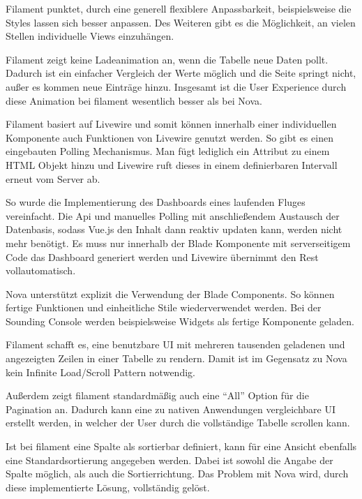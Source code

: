 \newpage

Filament punktet, durch eine generell flexiblere Anpassbarkeit, beispielsweise die Styles lassen sich besser anpassen.
Des Weiteren gibt es die Möglichkeit, an vielen Stellen individuelle Views einzuhängen.

Filament zeigt keine Ladeanimation an, wenn die Tabelle neue Daten pollt.
Dadurch ist ein einfacher Vergleich der Werte möglich und die Seite springt nicht, außer es kommen neue Einträge hinzu.
Insgesamt ist die User Experience durch diese Animation bei filament wesentlich besser als bei Nova.

Filament basiert auf Livewire\cite{livewire} und somit können innerhalb einer individuellen Komponente auch Funktionen von Livewire genutzt werden.
So gibt es einen eingebauten Polling Mechanismus.
Man fügt lediglich ein Attribut zu einem HTML Objekt hinzu und Livewire ruft dieses in einem definierbaren Intervall erneut vom Server ab.

So wurde die Implementierung des Dashboards eines laufenden Fluges vereinfacht.
Die Api und manuelles Polling mit anschließendem Austausch der Datenbasis, sodass Vue.js den Inhalt dann reaktiv updaten kann, werden nicht mehr benötigt.
Es muss nur innerhalb der Blade Komponente mit serverseitigem Code das Dashboard generiert werden und Livewire übernimmt den Rest vollautomatisch.

\newpage

Nova unterstützt explizit die Verwendung der Blade Components.
So können fertige Funktionen und einheitliche Stile wiederverwendet werden.
Bei der Sounding Console werden beispielsweise Widgets als fertige Komponente geladen.

Filament schafft es, eine benutzbare UI mit mehreren tausenden geladenen und angezeigten Zeilen in einer Tabelle zu rendern.
Damit ist im Gegensatz zu Nova kein Infinite Load/Scroll Pattern notwendig.

Außerdem zeigt filament standardmäßig auch eine \enquote{All} Option für die Pagination an.
Dadurch kann eine zu nativen Anwendungen vergleichbare UI erstellt werden, in welcher der User durch die vollständige Tabelle scrollen kann.

Ist bei filament eine Spalte als sortierbar definiert, kann für eine Ansicht ebenfalls eine Standardsortierung angegeben werden.
Dabei ist sowohl die Angabe der Spalte möglich, als auch die Sortierrichtung.
Das Problem mit Nova wird, durch diese implementierte Lösung, vollständig gelöst.

